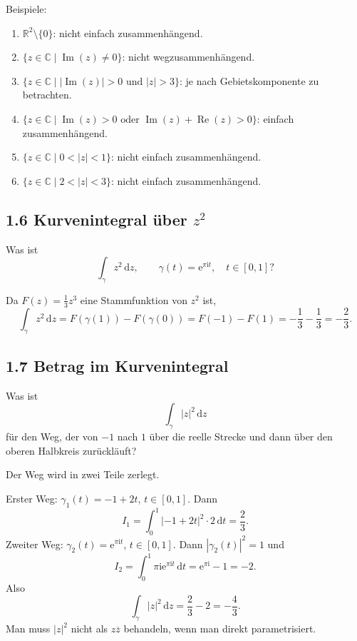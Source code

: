 \documentclass[11pt,a4paper]{article}
\newcommand{\C}{\mathbb C}
\newcommand{\R}{\mathbb R}
\newcommand{\ii}{\mathrm i}
\newcommand{\ee}{\mathrm e}
\newcommand{\dd}{\,\mathrm d}
\newcommand{\Ree}{\operatorname{Re}}
\newcommand{\Imm}{\operatorname{Im}}
\begin{document}
Beispiele:
\begin{enumerate}[label=\alph*)]
\item $\R^2\setminus\{0\}$: nicht einfach zusammenhängend.
\item $\{z\in\C\mid \Imm(z)\neq0\}$: nicht wegzusammenhängend.
\item $\{z\in\C\mid |\Imm(z)|>0\text{ und }|z|>3\}$: je nach Gebietskomponente zu betrachten.
\item $\{z\in\C\mid \Imm(z)>0\text{ oder }\Imm(z)+\Ree(z)>0\}$: einfach zusammenhängend.
\item $\{z\in\C\mid 0<|z|<1\}$: nicht einfach zusammenhängend.
\item $\{z\in\C\mid 2<|z|<3\}$: nicht einfach zusammenhängend.
\end{enumerate}

\subsection{1.6 Kurvenintegral über $z^2$}
\begin{fragebox}
Was ist
\[
\int_\gamma z^2\dd z,
\qquad \gamma(t)=\ee^{\pi\ii t},\quad t\in[0,1]?
\]
\end{fragebox}
\begin{antwortbox}
Da $F(z)=\frac13z^3$ eine Stammfunktion von $z^2$ ist,
\[
\int_\gamma z^2\dd z=F(\gamma(1))-F(\gamma(0))
=F(-1)-F(1)=-\frac13-\frac13=-\frac23.
\]
\end{antwortbox}

\subsection{1.7 Betrag im Kurvenintegral}
\begin{fragebox}
Was ist
\[
\int_\gamma |z|^2\dd z
\]
für den Weg, der von $-1$ nach $1$ über die reelle Strecke und dann über den oberen Halbkreis zurückläuft?
\end{fragebox}
\begin{antwortbox}
Der Weg wird in zwei Teile zerlegt.

Erster Weg: $\gamma_1(t)=-1+2t$, $t\in[0,1]$. Dann
\[
I_1=\int_0^1|-1+2t|^2\cdot2\dd t=\frac23.
\]
Zweiter Weg: $\gamma_2(t)=\ee^{\pi\ii t}$, $t\in[0,1]$. Dann $|\gamma_2(t)|^2=1$ und
\[
I_2=\int_0^1 \pi\ii\ee^{\pi\ii t}\dd t=\ee^{\pi\ii}-1=-2.
\]
Also
\[
\int_\gamma |z|^2\dd z=\frac23-2=-\frac43.
\]
Man muss $|z|^2$ nicht als $z\overline z$ behandeln, wenn man direkt parametrisiert.
\end{antwortbox}
\end{document}
